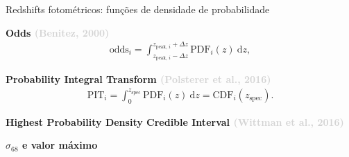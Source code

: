 \begin{frame}[c]{Redshifts fotométricos: funções de densidade de probabilidade}

    \begin{splusbox}{\textbf{Odds \textcolor{LightGray}{(Benitez, 2000)}}}
        \small
        \vspace{-.5cm}
        \begin{align*}
          \text{odds}_i = \int_{z_\text{peak, $i$}-\Delta z}^{z_\text{peak, $i$}+\Delta z} \text{PDF}_i(z)~\text{d}z,
        \end{align*}
    \end{splusbox}

    \begin{splusbox}{\textbf{Probability Integral Transform \textcolor{LightGray}{(Polsterer et al., 2016)}}}
        \small
        \vspace{-.5cm}
        \begin{align*}
            \text{PIT}_i = \int_{0}^{z_\text{spec}} \text{PDF}_i(z)~\text{d}z = \text{CDF}_i(z_\text{spec}).
          \end{align*}
    \end{splusbox}

    \centering
    \begin{tcolorbox}[hbox]
        \small
        \textbf{Highest Probability Density Credible Interval \textcolor{LightGray}{(Wittman et al., 2016)}}
    \end{tcolorbox}

    \begin{tcolorbox}[hbox]
        \small
        \textbf{$\sigma_{68}$ e valor máximo}
    \end{tcolorbox}

\end{frame}

